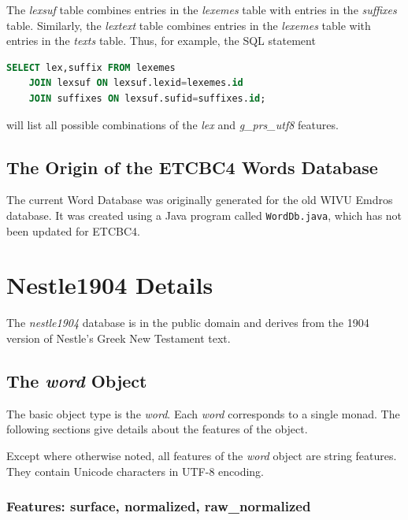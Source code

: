 \documentclass[11pt,oneside,a4paper]{memoir}
\begin{document}
The \emph{lexsuf} table combines entries in the \emph{lexemes} table with entries in the
\emph{suffixes} table. Similarly, the \emph{lextext} table combines entries in the \emph{lexemes}
table with entries in the \emph{texts} table. Thus, for example, the SQL statement

\begin{lstlisting}[language=SQL]
SELECT lex,suffix FROM lexemes
    JOIN lexsuf ON lexsuf.lexid=lexemes.id
    JOIN suffixes ON lexsuf.sufid=suffixes.id;
\end{lstlisting}

\noindent
will list all possible combinations of the \emph{lex} and \emph{g\_prs\_utf8} features.

\section{The Origin of the ETCBC4 Words Database}

The current Word Database was originally generated for the old WIVU Emdros database. It was created
using a Java program called \texttt{WordDb.java}, which has not been updated for ETCBC4.


\chapter{Nestle1904 Details}\label{nestle-app}

The \emph{nestle1904} database is in the public domain and derives from the 1904 version of Nestle's
Greek New Testament text.

\section{The \emph{word} Object}

The basic object type is the \emph{word}. Each \emph{word} corresponds to a single monad. The following
sections give details about the features of the object.

Except where otherwise noted, all features of the \emph{word} object are string features. They
contain Unicode characters in UTF-8 encoding.

\subsection{Features: surface, normalized, raw\_normalized}
\end{document}
